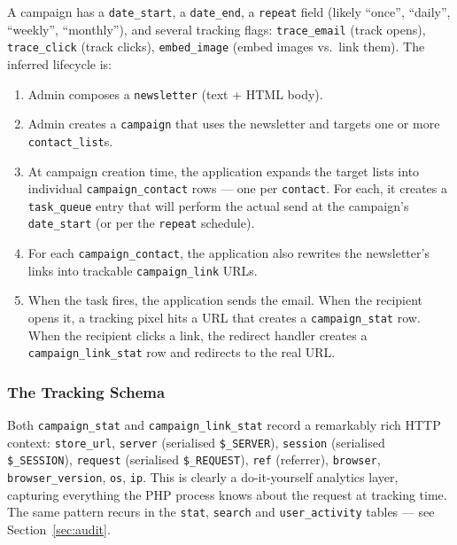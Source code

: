 \documentclass[11pt,a4paper]{article}
\begin{document}
A campaign has a \texttt{date\_start}, a \texttt{date\_end}, a
\texttt{repeat} field (likely ``once'', ``daily'', ``weekly'',
``monthly''), and several tracking flags:
\texttt{trace\_email} (track opens), \texttt{trace\_click}
(track clicks), \texttt{embed\_image} (embed images vs.\ link
them). The inferred lifecycle is:

\begin{enumerate}[leftmargin=1.6em,itemsep=2pt]
  \item Admin composes a \texttt{newsletter} (text + HTML body).
  \item Admin creates a \texttt{campaign} that uses the newsletter
        and targets one or more \texttt{contact\_list}s.
  \item At campaign creation time, the application expands the
        target lists into individual \texttt{campaign\_contact}
        rows --- one per \texttt{contact}. For each, it creates a
        \texttt{task\_queue} entry that will perform the actual
        send at the campaign's \texttt{date\_start} (or per the
        \texttt{repeat} schedule).
  \item For each \texttt{campaign\_contact}, the application also
        rewrites the newsletter's links into trackable
        \texttt{campaign\_link} URLs.
  \item When the task fires, the application sends the email.
        When the recipient opens it, a tracking pixel hits a
        URL that creates a \texttt{campaign\_stat} row. When
        the recipient clicks a link, the redirect handler
        creates a \texttt{campaign\_link\_stat} row and
        redirects to the real URL.
\end{enumerate}

\subsubsection{The Tracking Schema}

Both \texttt{campaign\_stat} and \texttt{campaign\_link\_stat}
record a remarkably rich HTTP context: \texttt{store\_url},
\texttt{server} (serialised \texttt{\$\_SERVER}),
\texttt{session} (serialised \texttt{\$\_SESSION}),
\texttt{request} (serialised \texttt{\$\_REQUEST}),
\texttt{ref} (referrer), \texttt{browser},
\texttt{browser\_version}, \texttt{os}, \texttt{ip}. This is
clearly a do-it-yourself analytics layer, capturing everything
the PHP process knows about the request at tracking time. The
same pattern recurs in the \texttt{stat}, \texttt{search} and
\texttt{user\_activity} tables --- see Section~\ref{sec:audit}.
\end{document}
